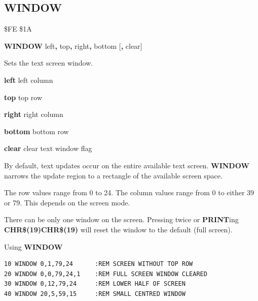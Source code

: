 \subsection{WINDOW}
\begin{description}[leftmargin=2cm,style=nextline]
\item [Token:] \$FE \$1A
\item [Format:] {\bf WINDOW} left{\bf,} top{\bf,} right{\bf,} bottom
		[{\bf,} clear]
\item [Usage:] Sets the text screen window.

                 {\bf left} left column

                 {\bf top} top row

                 {\bf right} right column

                 {\bf bottom} bottom row

                 {\bf clear} clear text window flag

               By default, text updates occur on the entire available text
               screen. {\bf WINDOW} narrows the update region to a rectangle
               of the available screen space.

\item [Remarks:] The row values range from 0 to 24.
                 The column values range from 0 to either 39 or 79.
                 This depends on the screen mode.

                 There can be only one window on the screen.
                 Pressing  twice or {\bf PRINT}ing
                 {\bf CHR\$(19)CHR\$(19)} will reset the window
                 to the default (full screen).

\item [Example:] Using {\bf WINDOW}
\begin{tcolorbox}[colback=black,coltext=white]
\verbatimfont{\codefont}
\begin{verbatim}
10 WINDOW 0,1,79,24      :REM SCREEN WITHOUT TOP ROW
20 WINDOW 0,0,79,24,1    :REM FULL SCREEN WINDOW CLEARED
30 WINDOW 0,12,79,24     :REM LOWER HALF OF SCREEN
40 WINDOW 20,5,59,15     :REM SMALL CENTRED WINDOW
\end{verbatim}
\end{tcolorbox}
\end{description}


\newpage
